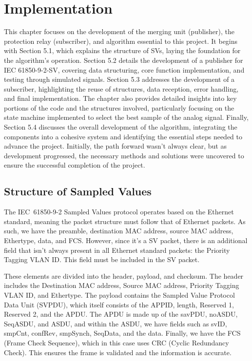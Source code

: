 
\chapter{Implementation} %

\label{chap:Chapter5} %


This chapter focuses on the development of the merging unit (publisher), the protection relay (subscriber), and algorithm essential to this project. It begins with Section 5.1, which explains the structure of SVs, laying the foundation for the algorithm's operation. Section 5.2 details the development of a publisher for IEC 61850-9-2-SV, covering data structuring, core function implementation, and testing through simulated signals. Section 5.3 addresses the development of a subscriber, highlighting the reuse of structures, data reception, error handling, and final implementation. The chapter also provides detailed insights into key portions of the code and the structures involved, particularly focusing on the state machine implemented to select the best sample of the analog signal. Finally, Section 5.4 discusses the overall development of the algorithm, integrating the components into a cohesive system and identifying the essential steps needed to advance the project. Initially, the path forward wasn't always clear, but as development progressed, the necessary methods and solutions were uncovered to ensure the successful completion of the project.

\section{Structure of Sampled Values}

\label{sec:Structure_of_Sampled_Values}
The IEC~61850-9-2 Sampled Values protocol operates based on the Ethernet standard, meaning the packet structure must follow that of Ethernet packets. As such, we have the preamble, destination MAC address, source MAC address, Ethertype, data, and FCS. However, since it's a SV packet, there is an additional field that isn't always present in all Ethernet standard packets: the Priority Tagging VLAN ID. This field must be included in the SV packet.

These elements are divided into the header, payload, and checksum. The header includes the Destination MAC address, Source MAC address, Priority Tagging VLAN ID, and Ethertype. The payload contains the Sampled Value Protocol Data Unit (SVPDU), which itself consists of the APPID, length, Reserved 1, Reserved 2, and the APDU. The APDU is made up of the savPDU, noASDU, SeqASDU, and ASDU, and within the ASDU, we have fields such as svID, smpCnt, confRev, smpSynch, SeqData, and the data. Finally, we have the FCS (Frame Check Sequence), which in this case uses CRC (Cyclic Redundancy Check). This ensures the frame is validated and the information is accurate.

